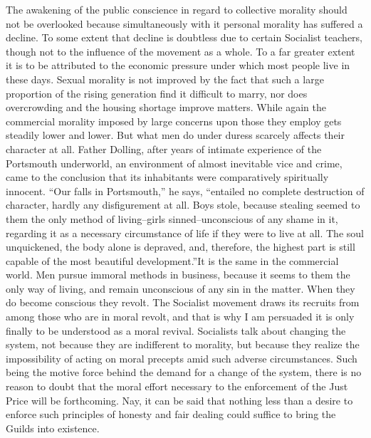 \documentclass{book}
\begin{document}
The awakening of the public conscience in regard to collective morality should not be overlooked because simultaneously with it personal morality has suffered a decline. To some extent that decline is doubtless due to certain Socialist teachers, though not to the influence of the movement as a whole. To a far greater extent it is to be attributed to the economic pressure under which most people live in these days. Sexual morality is not improved by the fact that such a large proportion of the rising generation find it difficult to marry, nor does overcrowding and the housing shortage improve matters. While again the commercial morality imposed by large concerns upon those they employ gets steadily lower and lower. But what men do under duress scarcely affects their character at all. Father Dolling, after years of intimate experience of the Portsmouth underworld, an environment of almost inevitable vice and crime, came to the conclusion that its inhabitants were comparatively spiritually innocent. “Our falls in Portsmouth,” he says, “entailed no complete destruction of character, hardly any disfigurement at all. Boys stole, because stealing seemed to them the only method of living–girls sinned–unconscious of any shame in it, regarding it as a necessary circumstance of life if they were to live at all. The soul unquickened, the body alone is depraved, and, therefore, the highest part is still capable of the most beautiful development.”\footnotemark[1] It is the same in the commercial world. Men pursue immoral methods in business, because it seems to them the only way of living, and remain unconscious of any sin in the matter. When they do become conscious they revolt. The Socialist movement draws its recruits from among those who are in moral revolt, and that is why I am persuaded it is only finally to be understood as a moral revival. Socialists talk about changing the system, not because they are indifferent to morality, but because they realize the impossibility of acting on moral precepts amid such adverse circumstances. Such being the motive force behind the demand for a change of the system, there is no reason to doubt that the moral effort necessary to the enforcement of the Just Price will be forthcoming. Nay, it can be said that nothing less than a desire to enforce such principles of honesty and fair dealing could suffice to bring the Guilds into existence.
\end{document}
